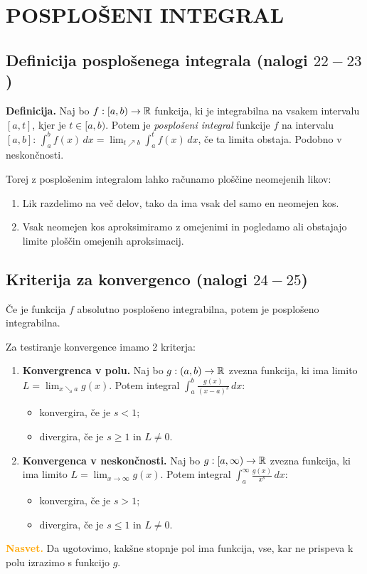 \section{POSPLOŠENI INTEGRAL}
{\color{Purple} \subsection*{Definicija posplošenega integrala (nalogi $22-23$)}}
\textbf{Definicija.} Naj bo $f: [a, b) \to \mathbb{R}$ funkcija, ki je integrabilna na vsakem intervalu $[a,t]$, kjer je $t \in [a, b)$. Potem je \emph{posplošeni integral} funkcije $f$ na intervalu $[a, b]$: $\displaystyle \int_{a}^{b} f(x)  \,dx = \lim_{t \nearrow  b}  \int_{a}^{t} f(x)  \,dx $, če ta limita obstaja. Podobno v neskončnosti.

Torej z posplošenim integralom lahko računamo ploščine neomejenih likov:
\begin{enumerate}
    \item Lik razdelimo na več delov, tako da ima vsak del samo en neomejen kos.
    \item Vsak neomejen kos aproksimiramo z omejenimi in pogledamo ali obstajajo limite ploščin omejenih aproksimacij.
\end{enumerate}

{\color{Purple} \subsection*{Kriterija za konvergenco (nalogi $24-25$)}}
Če je funkcija $f$ absolutno posplošeno integrabilna, potem je posplošeno integrabilna.

Za testiranje konvergence imamo 2 kriterja:
\begin{enumerate}
    \item \textbf{Konvergrenca v polu.} Naj bo $g: (a,b) \to \mathbb{R}$ zvezna funkcija, ki ima limito $\displaystyle L = \lim_{x \searrow a}g(x)$. Potem integral $\displaystyle \int_{a}^{b} \frac{g(x)}{(x-a)^s}  \,dx $:
    \begin{itemize}
        \item konvergira, če je $s<1$;
        \item divergira, če je $s \geq 1$ in $L \neq 0$.
    \end{itemize}
    \item \textbf{Konvergenca v neskončnosti.} Naj bo $g: [a,\infty) \to \mathbb{R}$ zvezna funkcija, ki ima limito $\displaystyle L = \lim_{x \to \infty}g(x)$. Potem integral $\displaystyle \int_{a}^{\infty} \frac{g(x)}{x^s}  \,dx $:
    \begin{itemize}
        \item konvergira, če je $s>1$;
        \item divergira, če je $s \leq 1$ in $L \neq 0$.
    \end{itemize}
\end{enumerate}

\textbf{\textcolor{Orange}{Nasvet.}} Da ugotovimo, kakšne stopnje pol ima funkcija, vse, kar ne prispeva k polu izrazimo s funkcijo $g$.